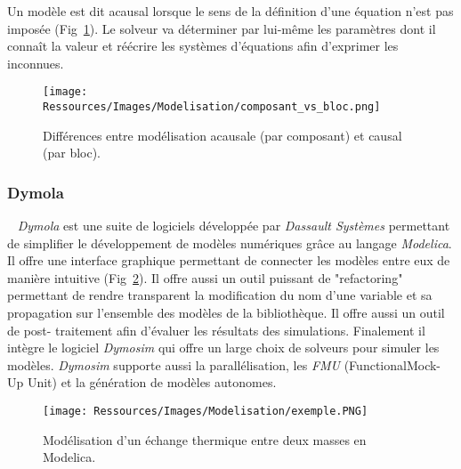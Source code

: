 \begin{Def}[Acausale]\label{def:acausal}
Un modèle est dit acausal lorsque le sens de la définition d’une équation n’est pas
imposée (Fig~\ref{fig:acausal_vs_causal}). Le solveur va déterminer par lui-même les
paramètres dont il connaît la valeur et réécrire les systèmes d’équations afin d’exprimer
les inconnues.
\end{Def}

\begin{figure}
    \begin{center}
        \texttt{[image: Ressources/Images/Modelisation/composant\_vs\_bloc.png]}
    \end{center}
    \caption{Différences entre modélisation acausale (par composant) et causal (par bloc).
             \label{fig:acausal_vs_causal}}
\end{figure}

\subsubsection{Dymola} %
\label{ssub:dymola}
~
\textit{Dymola} est une suite de logiciels développée par \textit{Dassault Systèmes}
permettant de simplifier le développement de modèles numériques grâce au langage
\textit{Modelica}. Il offre une interface graphique permettant de connecter les modèles
entre eux de manière intuitive (Fig~\ref{fig:exemple_modelica}). Il offre aussi un outil
puissant de "refactoring" permettant de rendre transparent la modification du nom d’une
variable et sa propagation sur l’ensemble des modèles de la bibliothèque. Il offre aussi
un outil de post- traitement afin d’évaluer les résultats des simulations. Finalement il
intègre le logiciel \textit{Dymosim} qui offre un large choix de solveurs pour simuler les
modèles. \textit{Dymosim} supporte aussi la parallélisation, les \emph{FMU}
(FunctionalMock-Up Unit) et la génération de modèles autonomes.
\begin{figure}
    \begin{center}
        \texttt{[image: Ressources/Images/Modelisation/exemple.PNG]}
    \end{center}
    \caption{Modélisation d’un échange thermique entre deux masses en Modelica.
             \label{fig:exemple_modelica}}
\end{figure}




